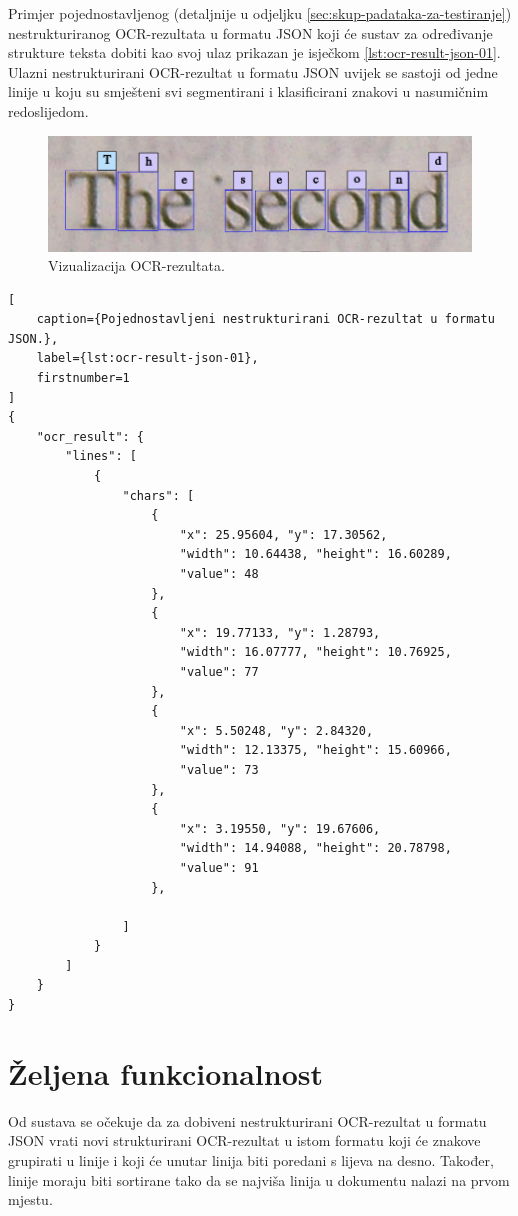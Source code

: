 \documentclass[times, utf8, zavrsni]{fer}
\begin{document}
Primjer pojednostavljenog (detaljnije u odjeljku
\ref{sec:skup-padataka-za-testiranje}) nestrukturiranog OCR-rezultata u formatu
JSON koji će sustav za određivanje strukture teksta dobiti kao svoj ulaz
prikazan je isječkom \ref{lst:ocr-result-json-01}. Ulazni nestrukturirani
OCR-rezultat u formatu JSON uvijek se sastoji od jedne linije u koju
su smješteni svi segmentirani i klasificirani znakovi u nasumičnim redoslijedom.

\begin{figure}[htb]
    \centering
    \includegraphics[width=\textwidth]{images/book-example-02.png}
    \caption{Vizualizacija OCR-rezultata.}
    \label{fig:book-example-02}
\end{figure}

\begin{lstlisting}[
    caption={Pojednostavljeni nestrukturirani OCR-rezultat u formatu JSON.},
    label={lst:ocr-result-json-01},
    firstnumber=1
]
{
    "ocr_result": {
        "lines": [
            {
                "chars": [
                    {
                        "x": 25.95604, "y": 17.30562,
                        "width": 10.64438, "height": 16.60289,
                        "value": 48
                    },
                    {
                        "x": 19.77133, "y": 1.28793,
                        "width": 16.07777, "height": 10.76925,
                        "value": 77
                    },
                    {
                        "x": 5.50248, "y": 2.84320,
                        "width": 12.13375, "height": 15.60966,
                        "value": 73
                    },
                    {
                        "x": 3.19550, "y": 19.67606,
                        "width": 14.94088, "height": 20.78798,
                        "value": 91
                    },

                ]
            }
        ]
    }
}
\end{lstlisting}








\section{Željena funkcionalnost}
\label{sec:željena-funkcionalnost}
Od sustava se očekuje da za dobiveni nestrukturirani OCR-rezultat u formatu
JSON vrati novi strukturirani OCR-rezultat u istom formatu koji će znakove
grupirati u linije i koji će unutar linija biti poredani s lijeva na desno.
Također, linije moraju biti sortirane tako da se najviša linija u dokumentu
nalazi na prvom mjestu.
\end{document}
